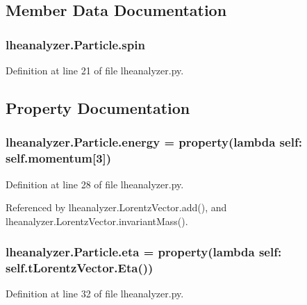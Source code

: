 \subsection{Member Data Documentation}
\subsubsection[{spin}]{\setlength{\rightskip}{0pt plus 5cm}lheanalyzer.\-Particle.\-spin}\label{classlheanalyzer_1_1Particle_a371705b75ae787f9876d764427858b28}


Definition at line 21 of file lheanalyzer.\-py.



\subsection{Property Documentation}
\subsubsection[{energy}]{\setlength{\rightskip}{0pt plus 5cm}lheanalyzer.\-Particle.\-energy = property(lambda self\-: self.\-momentum\mbox{[}3\mbox{]})\hspace{0.3cm}{\ttfamily [static]}}\label{classlheanalyzer_1_1Particle_a6dff44bd61eee7c801d20fc897ba3234}


Definition at line 28 of file lheanalyzer.\-py.



Referenced by lheanalyzer.\-Lorentz\-Vector.\-add(), and lheanalyzer.\-Lorentz\-Vector.\-invariant\-Mass().

\subsubsection[{eta}]{\setlength{\rightskip}{0pt plus 5cm}lheanalyzer.\-Particle.\-eta = property(lambda self\-: self.\-t\-Lorentz\-Vector.\-Eta())\hspace{0.3cm}{\ttfamily [static]}}\label{classlheanalyzer_1_1Particle_a3b25b63ffcd271b0aaf3fc2f42a366b4}


Definition at line 32 of file lheanalyzer.\-py.

